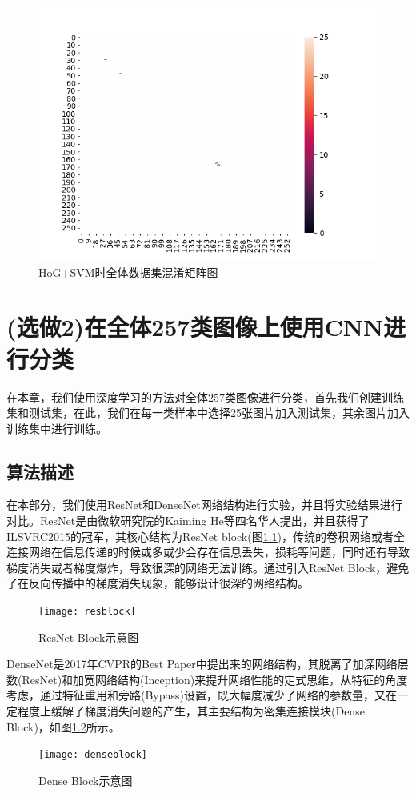 \documentclass[cn]{elegantbook}
\begin{document}
\begin{figure}[!h]
	\centering
	\includegraphics[width=0.9\linewidth]{../results/hog_svm_lin_all}
	\caption{\label{cm_all_1}HoG+SVM时全体数据集混淆矩阵图}
\end{figure}

\chapter{(选做2)在全体257类图像上使用CNN进行分类}
在本章，我们使用深度学习的方法对全体257类图像进行分类，首先我们创建训练集和测试集，在此，我们在每一类样本中选择25张图片加入测试集，其余图片加入训练集中进行训练。

\section{算法描述}
在本部分，我们使用ResNet和DenseNet网络结构进行实验，并且将实验结果进行对比。ResNet是由微软研究院的Kaiming He等四名华人提出，并且获得了ILSVRC2015的冠军，其核心结构为ResNet block(图\ref{resblock})，传统的卷积网络或者全连接网络在信息传递的时候或多或少会存在信息丢失，损耗等问题，同时还有导致梯度消失或者梯度爆炸，导致很深的网络无法训练。通过引入ResNet Block，避免了在反向传播中的梯度消失现象，能够设计很深的网络结构。
\begin{figure}[!h]
	\centering
	\texttt{[image: resblock]}
	\caption{\label{resblock}ResNet Block示意图}
\end{figure}

DenseNet是2017年CVPR的Best Paper中提出来的网络结构，其脱离了加深网络层数(ResNet)和加宽网络结构(Inception)来提升网络性能的定式思维，从特征的角度考虑，通过特征重用和旁路(Bypass)设置，既大幅度减少了网络的参数量，又在一定程度上缓解了梯度消失问题的产生，其主要结构为密集连接模块(Dense Block)，如图\ref{denseblock}所示。
\begin{figure}[!h]
	\centering
	\texttt{[image: denseblock]}
	\caption{\label{denseblock}Dense Block示意图}
\end{figure}
\end{document}
